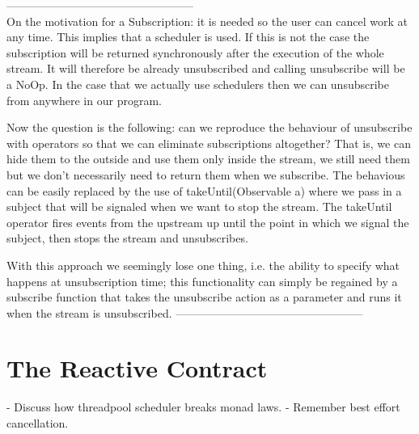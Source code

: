 --------------------------------------------------\\
On the motivation for a Subscription: it is needed so the user can cancel work at any time. This implies that a scheduler is used. If this is not the case the subscription will be returned synchronously after the execution of the whole stream. It will therefore be already unsubscribed and calling unsubscribe will be a NoOp. In the case that we actually use schedulers then we can unsubscribe from anywhere in our program. 

Now the question is the following: can we reproduce the behaviour of unsubscribe with operators so that we can eliminate subscriptions altogether? That is, we can hide them to the outside and use them only inside the stream, we still need them but we don't necessarily need to return them when we subscribe. The behavious can be easily replaced by the use of takeUntil(Observable a) where we pass in a subject that will be signaled when we want to stop the stream. The takeUntil operator fires events from the upstream up until the point in which we signal the subject, then stops the stream and unsubscribes. 

With this approach we seemingly lose one thing, i.e. the ability to specify what happens at unsubscription time; this functionality can simply be regained by a subscribe function that takes the unsubscribe action as a parameter and runs it when the stream is unsubscribed.
--------------------------------------------------



\section{The Reactive Contract}
\label{sec:contract}
- Discuss how threadpool scheduler breaks monad laws. 
- Remember best effort cancellation.